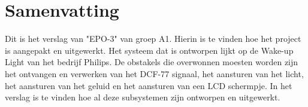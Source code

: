 \chapter{Samenvatting}
Dit is het verslag van "EPO-3" van groep A1. Hierin is te vinden hoe het project is aangepakt en uitgewerkt. Het systeem dat is ontworpen lijkt op de Wake-up Light van het bedrijf Philips. De obstakels die overwonnen moesten worden zijn het ontvangen en verwerken van het DCF-77 signaal, het aansturen van het licht, het aansturen van het geluid en het aansturen van een LCD schermpje. In het verslag is te vinden hoe al deze subsystemen zijn ontworpen en uitgewerkt. 